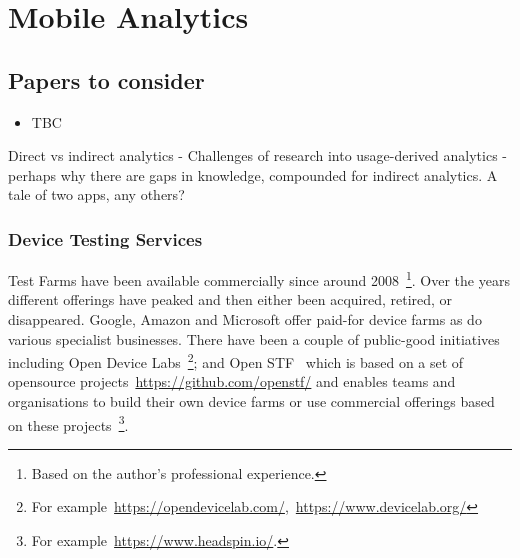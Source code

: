 \hypertarget{mobile.analytics}{}
\section{Mobile Analytics}

\subsection{Papers to consider}
\begin{itemize}
    \item TBC
\end{itemize}

Direct vs indirect analytics - 
Challenges of research into usage-derived analytics - perhaps why there are gaps in knowledge, compounded for indirect analytics. A tale of two apps, any others?

\subsubsection{Device Testing Services}
Test Farms have been available commercially since around 2008~\footnote{Based on the author's professional experience.}. Over the years different offerings have peaked and then either been acquired, retired, or disappeared. Google, Amazon and Microsoft offer paid-for device farms as do various specialist businesses. There have been a couple of public-good initiatives including Open Device Labs~\footnote{For example~\url{https://opendevicelab.com/},~\url{https://www.devicelab.org/}}; and Open STF~\cite{openstf_website} which is based on a set of opensource projects~\url{https://github.com/openstf/} and enables teams and organisations to build their own device farms or use commercial offerings based on these projects~\footnote{For example~\url{https://www.headspin.io/}.}.
